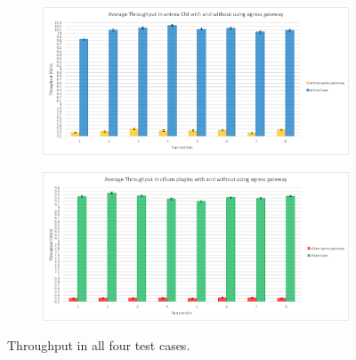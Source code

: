 \begin{figure}[H]
    \begin{subfigure}[b]{0.45\textwidth}
        \includegraphics[width=\textwidth]{plots/egress/throughput_antrea.png}
        \caption{}
        \label{fig:throughput_c}
    \end{subfigure}
    \hfill
    \begin{subfigure}[b]{0.45\textwidth}
        \includegraphics[width=\textwidth]{plots/egress/throughput_cilium.png}
        \caption{}
        \label{fig:throughput_d}
    \end{subfigure}
    
    \caption{Throughput in all four test cases.}
    \label{fig:throughFour}
\end{figure}

